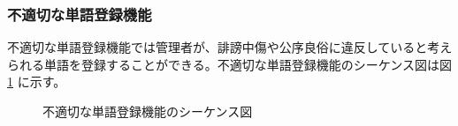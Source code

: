 \documentclass[a4j]{jarticle}
\begin{document}
 \subsubsection{不適切な単語登録機能}
 不適切な単語登録機能では管理者が、誹謗中傷や公序良俗に違反していると考えられる単語を登録することができる。不適切な単語登録機能のシーケンス図は図 \ref{fig:admin_bbs_wordentry.png} に示す。
              \begin{figure}[H]
\centering
{}
\caption{不適切な単語登録機能のシーケンス図}
\label{fig:admin_bbs_wordentry.png}
\end{figure}
\end{document}
